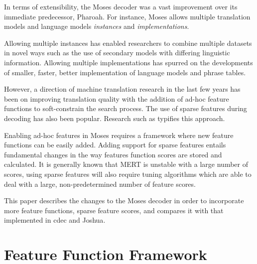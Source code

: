 \documentclass{pbml}
\begin{document}

In terms of extensibility, the Moses\cite{koehn-EtAl:2007:PosterDemo} decoder was a vast improvement over its immediate predecessor, Pharoah\cite{Koehn:Pharaoh:2004}. For instance, Moses allows multiple translation models and language models \emph{instances} and \emph{implementations}. 

Allowing multiple instances has enabled researchers to combine multiple datasets in novel ways such as the use of secondary models with differing linguistic information\cite{Koehn:Philipp:2007, Sennrich:Rico:2011,Koehn:Philipp:2012}. Allowing multiple implementations has spurred on the developments of smaller, faster, better implementation of language models and phrase tables\cite{talbot-osborne:2007:ACLMain, Heafield-kenlm, Junczys-Dowmunt:Marcin:2012}.

However, a direction of machine translation research in the last few years has been on improving translation quality with the addition of ad-hoc feature functions to soft-constrain the search process. The use of sparse features during decoding has also been popular. Research such as \cite{chiang-knight-wang:2009:NAACLHLT09, cherry:2013:NAACL-HLT} typifies this approach.

Enabling ad-hoc features in Moses requires a framework where new feature functions can be easily added. Adding support for sparse features entails fundamental changes in the way features function scores are stored and calculated. It is generally known that MERT\cite{Och:MERT} is unstable with a large number of scores, using sparse features will also require tuning algorithms which are able to deal with a large, non-predetermined number of feature scores. 

This paper describes the changes to the Moses decoder in order to incorporate more feature functions, sparse feature scores, and compares it with that implemented in cdec\cite{Dyer_etal_2010} and Joshua\cite{Joshua-Decoder}.

\section{Feature Function Framework}
\end{document}
